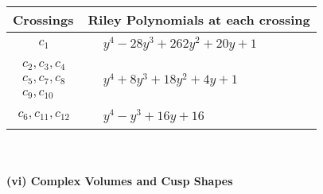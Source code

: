 \documentclass[1p]{elsarticle_modified}
\theoremstyle{definition}
\begin{document}
\begin{tabular}{m{50pt}|m{274pt}}
Crossings & \hspace{64pt}Riley Polynomials at each crossing \\
\hline $$\begin{aligned}c_{1}\end{aligned}$$&$\begin{aligned}
&y^4-28 y^3+262 y^2+20 y+1
\end{aligned}$\\
\hline $$\begin{aligned}c_{2},c_{3},c_{4}\\c_{5},c_{7},c_{8}\\c_{9},c_{10}\end{aligned}$$&$\begin{aligned}
&y^4+8 y^3+18 y^2+4 y+1
\end{aligned}$\\
\hline $$\begin{aligned}c_{6},c_{11},c_{12}\end{aligned}$$&$\begin{aligned}
&y^4- y^3+16 y+16
\end{aligned}$\\
\hline
\end{tabular}\\~\\
\newpage\flushleft \textbf{(vi) Complex Volumes and Cusp Shapes}
\end{document}
